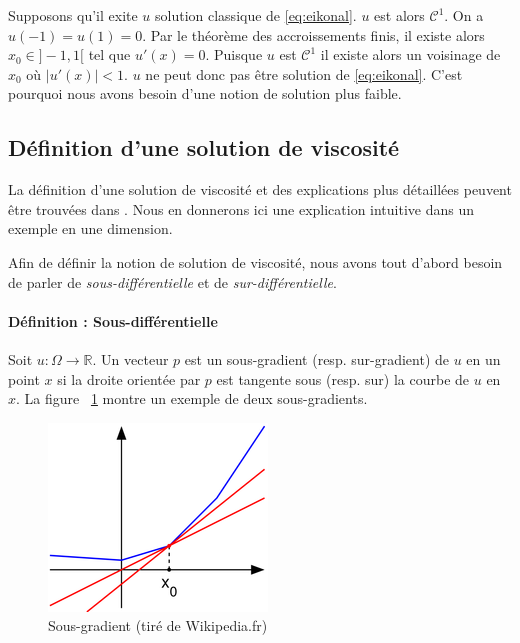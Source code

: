\documentclass[12pt,a4paper,twoside]{article}
\begin{document}
Supposons qu'il exite $u$ solution classique de \ref{eq:eikonal}. $u$ est alors $\mathcal{C}^1$.
On a $u(-1) = u(1) = 0$. Par le théorème des accroissements finis, il existe alors $x_0 \in ]-1,1[$ tel que  
$u'(x) = 0$. Puisque $u$ est $\mathcal{C}^1$ il existe alors un voisinage de $x_0$ où $|u'(x)| < 1$. 
$u$ ne peut donc pas être solution de \ref{eq:eikonal}. C'est pourquoi nous avons besoin d'une notion de solution
plus faible.

\subsection{Définition d'une solution de viscosité}

La définition d'une solution de viscosité et des explications plus détaillées  peuvent  être trouvées dans 
\cite{bressan2010viscosity}. Nous en donnerons ici une explication intuitive dans un exemple en une dimension. 

Afin de définir la notion de solution de viscosité, nous avons tout d'abord besoin de parler de \emph{sous-différentielle} et de \emph{sur-différentielle}.

\paragraph*{Définition : Sous-différentielle}

Soit $u : \Omega \to \mathbb{R}$. Un vecteur $p$ est un sous-gradient (resp. sur-gradient) de $u$ en un point $x$ si la droite orientée par $p$ est tangente sous (resp. sur) la courbe de $u$ en $x$. La figure ~\ref{sousgradient}
montre un exemple de deux sous-gradients.

\begin{figure}
\begin{center}
\includegraphics[scale=0.7]{Images/sousgradient.png}
\caption{Sous-gradient (tiré de Wikipedia.fr)}
\label{sousgradient}
\end{center}
\end{figure}
\end{document}
